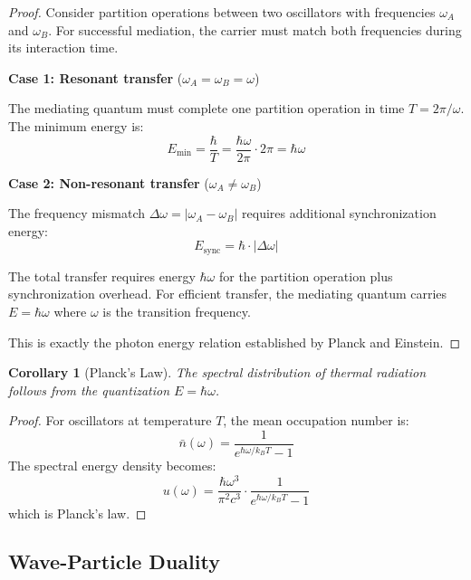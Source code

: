 \documentclass[aps,prl,twocolumn,superscriptaddress,floatfix]{revtex4-2}
\newtheorem{corollary}[theorem]{Corollary}
\begin{document}
\begin{proof}
Consider partition operations between two oscillators with frequencies $\omega_A$ and $\omega_B$. For successful mediation, the carrier must match both frequencies during its interaction time.

\textbf{Case 1: Resonant transfer} ($\omega_A = \omega_B = \omega$)

The mediating quantum must complete one partition operation in time $T = 2\pi/\omega$. The minimum energy is:
\begin{equation}
E_{\min} = \frac{\hbar}{T} = \frac{\hbar \omega}{2\pi} \cdot 2\pi = \hbar\omega
\end{equation}

\textbf{Case 2: Non-resonant transfer} ($\omega_A \neq \omega_B$)

The frequency mismatch $\Delta\omega = |\omega_A - \omega_B|$ requires additional synchronization energy:
\begin{equation}
E_{\text{sync}} = \hbar \cdot |\Delta\omega|
\end{equation}

The total transfer requires energy $\hbar\omega$ for the partition operation plus synchronization overhead. For efficient transfer, the mediating quantum carries $E = \hbar\omega$ where $\omega$ is the transition frequency.

This is exactly the photon energy relation established by Planck and Einstein.
\end{proof}

\begin{corollary}[Planck's Law]
The spectral distribution of thermal radiation follows from the quantization $E = \hbar\omega$.
\end{corollary}

\begin{proof}
For oscillators at temperature $T$, the mean occupation number is:
\begin{equation}
\bar{n}(\omega) = \frac{1}{e^{\hbar\omega/k_BT} - 1}
\end{equation}
The spectral energy density becomes:
\begin{equation}
u(\omega) = \frac{\hbar\omega^3}{\pi^2 c^3} \cdot \frac{1}{e^{\hbar\omega/k_BT} - 1}
\end{equation}
which is Planck's law.
\end{proof}

\subsection{Wave-Particle Duality}
\end{document}
